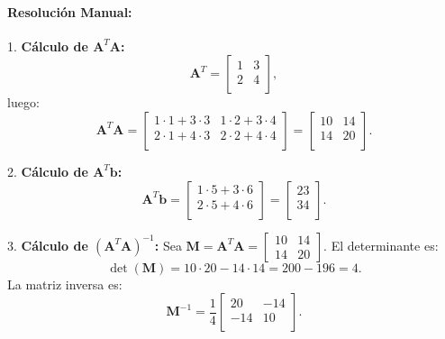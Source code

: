 \documentclass[12pt,a4,oneside]{book}
\begin{document}
	\paragraph{Resolución Manual:}
	
	1. \textbf{Cálculo de \(\mathbf{A}^T \mathbf{A}\):}
	\[
	\mathbf{A}^T = \begin{bmatrix}
		1 & 3 \\
		2 & 4 \\
	\end{bmatrix},
	\]
	luego:
	\[
	\mathbf{A}^T \mathbf{A} = \begin{bmatrix}
		1\cdot1 + 3\cdot3 & 1\cdot2 + 3\cdot4 \\
		2\cdot1 + 4\cdot3 & 2\cdot2 + 4\cdot4 \\
	\end{bmatrix} 
	= \begin{bmatrix}
		10 & 14 \\
		14 & 20 \\
	\end{bmatrix}.
	\]
	
	2. \textbf{Cálculo de \(\mathbf{A}^T \mathbf{b}\):}
	\[
	\mathbf{A}^T \mathbf{b} = \begin{bmatrix}
		1\cdot5 + 3\cdot6 \\
		2\cdot5 + 4\cdot6 \\
	\end{bmatrix}
	= \begin{bmatrix}
		23 \\
		34 \\
	\end{bmatrix}.
	\]
	
	3. \textbf{Cálculo de \((\mathbf{A}^T \mathbf{A})^{-1}\):}  
	Sea \(\mathbf{M} = \mathbf{A}^T \mathbf{A} = \begin{bmatrix}10 & 14 \\ 14 & 20\end{bmatrix}\).  
	El determinante es:
	\[
	\det(\mathbf{M}) = 10\cdot20 - 14\cdot14 = 200 - 196 = 4.
	\]
	La matriz inversa es:
	\[
	\mathbf{M}^{-1} = \frac{1}{4} \begin{bmatrix}
		20 & -14 \\
		-14 & 10 \\
	\end{bmatrix}.
	\]
	
\end{document}
